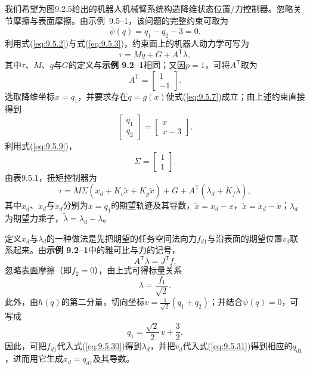 \documentclass[12pt,a4paper]{ctexart}
\begin{document}
我们希望为图9.2.5给出的机器人机械臂系统构造降维状态位置/力控制器。忽略关节摩擦与表面摩擦。由示例~9.5--1，该问题的完整约束可取为
\[
\bar{\psi}(q) = q_1 - q_2 - 3 = 0.
\]
利用式(\ref{eq:9.5.2})与式(\ref{eq:9.5.3})，约束面上的机器人动力学可写为
\begin{equation}\label{eq:9.5.24}
\tau = M\ddot{q} + G + A^{\mathsf T}\lambda,
\end{equation}
其中$\tau$、$M$、$q$与$G$的定义与\textbf{示例 9.2--1}相同；又因$p=1$，可将$A^{\mathsf T}$取为
\begin{equation}\label{eq:9.5.25}
A^{\mathsf T} = \begin{bmatrix} 1 \\ -1 \end{bmatrix}.
\end{equation}
选取降维坐标$x=q_1$，并要求存在$q=g(x)$使式(\ref{eq:9.5.7})成立；由上述约束直接得到
\begin{equation}\label{eq:9.5.26}
\begin{bmatrix} q_1 \\ q_2 \end{bmatrix} = \begin{bmatrix} x \\ x - 3 \end{bmatrix}.
\end{equation}
利用式(\ref{eq:9.5.9})，
\begin{equation}\label{eq:9.5.27}
\Sigma = \begin{bmatrix} 1 \\ 1 \end{bmatrix}.
\end{equation}
由表9.5.1，扭矩控制器为
\begin{equation}\label{eq:9.5.28}
\tau = M\Sigma(\ddot{x}_d + K_v\dot{\tilde{x}} + K_p \tilde{x}) + G + A^{\mathsf T}(\lambda_d + K_f \tilde{\lambda}),
\end{equation}
其中$x_d$、$\dot{x}_d$与$\ddot{x}_d$分别为$x=q_1$的期望轨迹及其导数，$\tilde{x}=x_d-x$，$\dot{\tilde{x}}=\dot{x}_d-\dot{x}$；$\lambda_d$为期望力乘子，$\tilde{\lambda}=\lambda_d-\lambda$。

定义$x_d$与$\lambda_d$的一种做法是先把期望的任务空间法向力$f_{d1}$与沿表面的期望位置$v_d$联系起来。由\textbf{示例 9.2--1}中的雅可比与力的记号，
\begin{equation}\label{eq:9.5.29}
A^{\mathsf T}\lambda = J^{\mathsf T}f.
\end{equation}
忽略表面摩擦（即$f_2=0$），由上式可得标量关系
\begin{equation}\label{eq:9.5.30}
\lambda = \frac{f_1}{\sqrt{2}}.
\end{equation}
此外，由$h(q)$的第二分量，切向坐标$v=\frac{1}{\sqrt{2}}(q_1+q_2)$；并结合$\bar{\psi}(q)=0$，可写成
\begin{equation}\label{eq:9.5.31}
q_1 = \frac{\sqrt{2}}{2}\,v + \frac{3}{2}.
\end{equation}
因此，可把$f_{d1}$代入式(\ref{eq:9.5.30})得到$\lambda_d$，并把$v_d$代入式(\ref{eq:9.5.31})得到相应的$q_{d1}$，进而用它生成$x_d=q_{d1}$及其导数。
\end{document}
